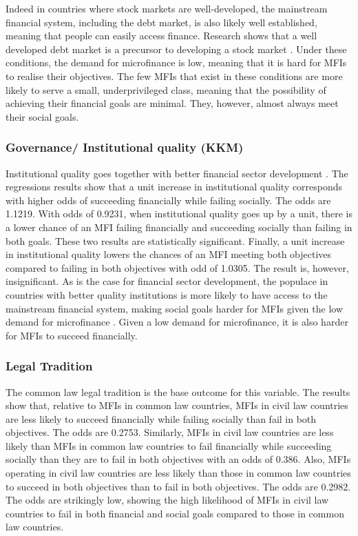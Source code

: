 \documentclass[a4paper, nobind]{templates/ociamthesis}
\begin{document}
Indeed in countries where stock markets are well-developed, the mainstream financial system, including the debt market, is also likely well established, meaning that people can easily access finance. Research shows that a well developed debt market is a precursor to developing a stock market \autocite{nguyen2012determinants,tsaurai2018determinants}. Under these conditions, the demand for microfinance is low, meaning that it is hard for MFIs to realise their objectives. The few MFIs that exist in these conditions are more likely to serve a small, underprivileged class, meaning that the possibility of achieving their financial goals are minimal. They, however, almost always meet their social goals.

\hypertarget{governance-institutional-quality-kkm}{%
\subsubsection{Governance/ Institutional quality (KKM)}\label{governance-institutional-quality-kkm}}

Institutional quality goes together with better financial sector development \autocite{allen2014african}. The regressions results show that a unit increase in institutional quality corresponds with higher odds of succeeding financially while failing socially. The odds are 1.1219. With odds of 0.9231, when institutional quality goes up by a unit, there is a lower chance of an MFI failing financially and succeeding socially than failing in both goals. These two results are statistically significant. Finally, a unit increase in institutional quality lowers the chances of an MFI meeting both objectives compared to failing in both objectives with odd of 1.0305. The result is, however, insignificant. As is the case for financial sector development, the populace in countries with better quality institutions is more likely to have access to the mainstream financial system, making social goals harder for MFIs given the low demand for microfinance \autocite{butkiewicz2006institutional}. Given a low demand for microfinance, it is also harder for MFIs to succeed financially.

\hypertarget{legal-tradition-1}{%
\subsubsection{Legal Tradition}\label{legal-tradition-1}}

The common law legal tradition is the base outcome for this variable. The results show that, relative to MFIs in common law countries, MFIs in civil law countries are less likely to succeed financially while failing socially than fail in both objectives. The odds are 0.2753. Similarly, MFIs in civil law countries are less likely than MFIs in common law countries to fail financially while succeeding socially than they are to fail in both objectives with an odds of 0.386. Also, MFIs operating in civil law countries are less likely than those in common law countries to succeed in both objectives than to fail in both objectives. The odds are 0.2982. The odds are strikingly low, showing the high likelihood of MFIs in civil law countries to fail in both financial and social goals compared to those in common law countries.
\end{document}

